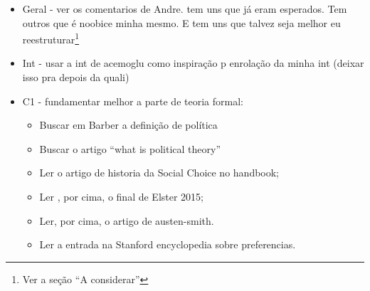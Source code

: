 \documentclass{article}
\begin{document}
\begin{itemize}

\item {\Large Geral - ver os comentarios de Andre. tem uns que já eram
    esperados. Tem outros que é noobice minha mesmo. E tem uns que talvez seja
    melhor eu reestruturar\footnote{\textcolor{base01}{Ver a seção ``A
        considerar''}}}
\item {\Large Int - usar a int de acemoglu como inspiração p enrolação da minha
    int (deixar isso pra depois da quali)}
\item {\Large C1  - fundamentar melhor a parte de teoria formal}:
  \begin{itemize}

  \item Buscar em Barber a definição de política
  \item Buscar o artigo ``what is political theory''
  \item Ler o artigo de historia da Social Choice no handbook;
  \item Ler , por cima, o  final de Elster 2015;
  \item Ler, por cima,  o artigo de austen-smith.
  \item Ler a entrada na Stanford encyclopedia sobre preferencias.
    
  \end{itemize}


\end{itemize}
\end{document}
